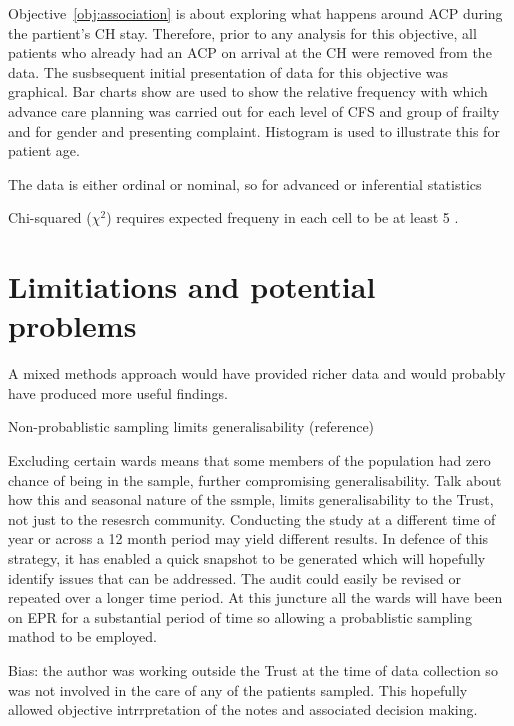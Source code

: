 \documentclass
[
	12pt,
	a4paper,
	oneside,
]{report}
\begin{document}
Objective~\ref{obj:association} is about exploring what happens around ACP
during the partient's CH stay. Therefore, prior to any analysis for this 
objective, all patients who already had an ACP on arrival at the CH were
removed from the data.
The susbsequent initial presentation of data for this objective was
graphical. Bar charts show are used to show the relative frequency with which 
advance care planning
was carried out for each level of CFS and group of frailty and for gender and
presenting complaint. Histogram is used to illustrate this for patient age.

The data is either ordinal or nominal, so for advanced or inferential 
statistics 

%
%

Chi-squared ($\chi^2$) requires expected frequeny in each cell to be at least 5 
\parencite[page 690]{field:09}.


\section{Limitiations and potential problems}

A mixed methods approach would have provided richer data and would probably
have produced more useful findings.

Non-probablistic sampling limits generalisability (reference)

Excluding certain wards means that some members of the
population had zero chance of being in the sample,
further compromising generalisability. Talk about how this
and seasonal nature of the ssmple, limits generalisability
to the Trust, not just to the resesrch community.
Conducting the study at a different time of year or across
a 12 month period may yield different results. In defence
of this strategy, it has enabled a quick snapshot to be
generated which will hopefully identify issues that can be
addressed. The audit could easily be revised or repeated 
over a longer time period. At this juncture all the wards 
will have been on EPR for a substantial period of time so
allowing a probablistic sampling mathod to be employed.


Bias: the author was working outside the Trust at the time 
of data collection so was not involved in the care of any
of the patients sampled. This hopefully allowed objective
intrrpretation of the notes and associated decision making.
\end{document}
